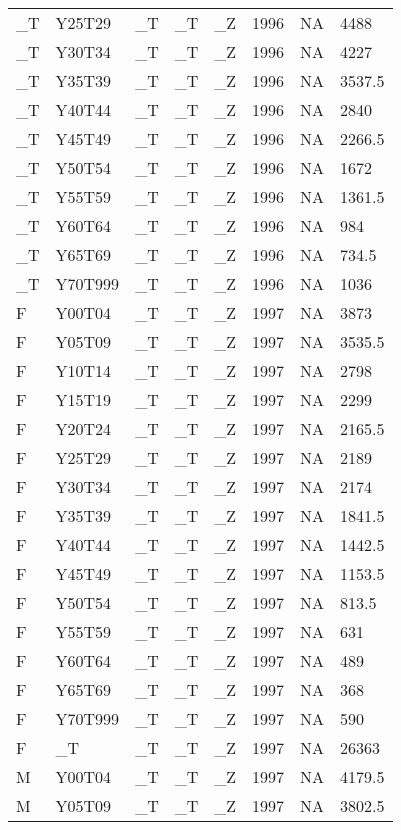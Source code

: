 \begin{longtable}[t]{llllllll}
\_T & Y25T29 & \_T & \_T & \_Z & 1996 & NA & 4488\\
\_T & Y30T34 & \_T & \_T & \_Z & 1996 & NA & 4227\\
\_T & Y35T39 & \_T & \_T & \_Z & 1996 & NA & 3537.5\\
\addlinespace
\_T & Y40T44 & \_T & \_T & \_Z & 1996 & NA & 2840\\
\_T & Y45T49 & \_T & \_T & \_Z & 1996 & NA & 2266.5\\
\_T & Y50T54 & \_T & \_T & \_Z & 1996 & NA & 1672\\
\_T & Y55T59 & \_T & \_T & \_Z & 1996 & NA & 1361.5\\
\_T & Y60T64 & \_T & \_T & \_Z & 1996 & NA & 984\\
\addlinespace
\_T & Y65T69 & \_T & \_T & \_Z & 1996 & NA & 734.5\\
\_T & Y70T999 & \_T & \_T & \_Z & 1996 & NA & 1036\\
F & Y00T04 & \_T & \_T & \_Z & 1997 & NA & 3873\\
F & Y05T09 & \_T & \_T & \_Z & 1997 & NA & 3535.5\\
F & Y10T14 & \_T & \_T & \_Z & 1997 & NA & 2798\\
\addlinespace
F & Y15T19 & \_T & \_T & \_Z & 1997 & NA & 2299\\
F & Y20T24 & \_T & \_T & \_Z & 1997 & NA & 2165.5\\
F & Y25T29 & \_T & \_T & \_Z & 1997 & NA & 2189\\
F & Y30T34 & \_T & \_T & \_Z & 1997 & NA & 2174\\
F & Y35T39 & \_T & \_T & \_Z & 1997 & NA & 1841.5\\
\addlinespace
F & Y40T44 & \_T & \_T & \_Z & 1997 & NA & 1442.5\\
F & Y45T49 & \_T & \_T & \_Z & 1997 & NA & 1153.5\\
F & Y50T54 & \_T & \_T & \_Z & 1997 & NA & 813.5\\
F & Y55T59 & \_T & \_T & \_Z & 1997 & NA & 631\\
F & Y60T64 & \_T & \_T & \_Z & 1997 & NA & 489\\
\addlinespace
F & Y65T69 & \_T & \_T & \_Z & 1997 & NA & 368\\
F & Y70T999 & \_T & \_T & \_Z & 1997 & NA & 590\\
F & \_T & \_T & \_T & \_Z & 1997 & NA & 26363\\
M & Y00T04 & \_T & \_T & \_Z & 1997 & NA & 4179.5\\
M & Y05T09 & \_T & \_T & \_Z & 1997 & NA & 3802.5\\

\end{longtable}
